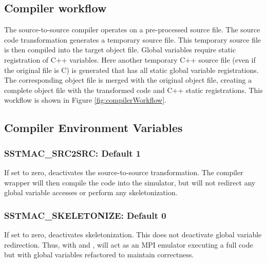 \subsection{Compiler workflow}
The source-to-source compiler operates on a pre-processed source file.
The source code transformation generates a temporary source file.
This temporary source file is then compiled into the target object file.
Global variables require static registration of C++ variables.
Here another temporary C++ source file (even if the original file is C)
is generated that has all static global variable registrations.
The corresponding object file is merged with the original object file,
creating a complete \sstmacro object file with the transformed code and C++ static registrations.
This workflow is shown in Figure \ref{fig:compilerWorkflow}.

\subsection{Compiler Environment Variables}

\subsubsection{SSTMAC\_SRC2SRC: Default 1}
If set to zero, deactivates the source-to-source transformation. 
The compiler wrapper will then compile the code into the simulator, but will not redirect any global variable accesses or perform any skeletonization.

\subsubsection{SSTMAC\_SKELETONIZE: Default 0}
If set to zero, deactivates skeletonization. 
This does not deactivate global variable redirection.
Thus, with  and ,
\sstmacro will act as an MPI emulator executing a full code but with global variables refactored to maintain correctness.


